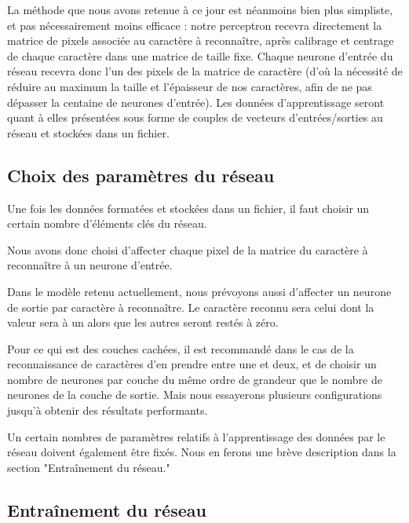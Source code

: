 \documentclass[a4paper,10pt]{report}
\begin{document}
La m\'ethode que nous avons retenue \`a ce jour est n\'eanmoins bien
plus simpliste, et pas n\'ecessairement moins efficace : notre
perceptron recevra directement la matrice de pixels associ\'ee au
caract\`ere \`a reconna\^itre, apr\`es calibrage et centrage de chaque
caract\`ere dans une matrice de taille fixe.
Chaque neurone d'entr\'ee du r\'eseau recevra donc l'un des pixels de la
matrice de caract\`ere (d'o\`u la n\'ecessit\'e de r\'eduire au maximum
la taille et l'\'epaisseur de nos caract\`eres, afin de ne pas
d\'epasser la centaine de neurones d'entr\'ee).
Les donn\'ees d'apprentissage seront quant \`a elles pr\'esent\'ees sous
forme de couples de vecteurs d'entr\'ees/sorties au r\'eseau et
stock\'ees dans un fichier.



\subsection{Choix des param\`etres du r\'eseau} %
\label{subsec:choix_des_parametres_du_reseau}

Une fois les donn\'ees format\'ees et stock\'ees dans un fichier, il
faut choisir un certain nombre d'éléments clés du réseau.

Nous avons donc choisi d'affecter chaque pixel de la matrice du
caract\`ere \`a reconna\^itre \`a un neurone d'entr\'ee.

Dans le mod\`ele retenu actuellement, nous pr\'evoyons aussi d'affecter
un neurone de sortie par caract\`ere \`a reconna\^itre. Le caract\`ere
reconnu sera celui dont la valeur sera \`a un alors que les autres seront
rest\'es \`a z\'ero.

Pour ce qui est des couches cach\'ees, il est recommand\'e dans le cas
de la reconnaissance de caract\`eres d'en prendre entre une et deux, et
de choisir un nombre de neurones par couche du m\^eme ordre de grandeur
que le nombre de neurones de la couche de sortie. Mais nous essayerons
plusieurs configurations jusqu'\`a obtenir des r\'esultats
performants.

Un certain nombres de param\`etres relatifs \`a l'apprentissage des
donn\'ees par le r\'eseau doivent \'egalement \^etre fix\'es. Nous en
ferons une br\`eve description dans la section "Entra\^inement du r\'eseau."


\subsection{Entra\^inement du r\'eseau} %
\label{subsec:entrainement_du_reseau}
\end{document}
